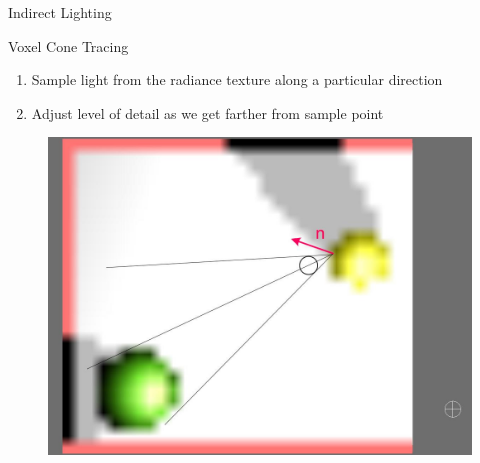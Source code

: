 \documentclass[10pt]{beamer}
\begin{document}
\begin{frame}{Indirect Lighting}
      \begin{block}{Voxel Cone Tracing}
        \begin{enumerate}
          \item Sample light from the radiance texture along a particular direction
          \item Adjust level of detail as we get farther from sample point
        \end{enumerate}
      \end{block}

      \begin{figure}
        \includegraphics[height=0.5\textheight]{conetrace2}
      \end{figure}
\end{frame}
\end{document}
